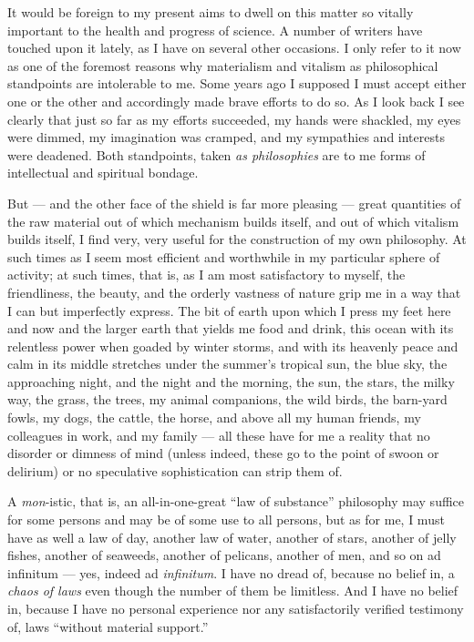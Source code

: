 \documentclass[a4paper, 11pt, oneside, polutonikogreek, english]{article}
\begin{document}
It would be foreign to my present aims to dwell on this matter so vitally important to the health and progress of science. A number of writers have touched upon it lately, as I have on several other occasions. I only refer to it now as one of the foremost reasons why materialism and vitalism as philosophical standpoints are intolerable to me. Some years ago I supposed I must accept either one or the other and accordingly made brave efforts to do so. As I look back I see clearly that just so far as my efforts succeeded, my hands were shackled, my eyes were dimmed, my imagination was cramped, and my sympathies and interests were deadened. Both standpoints, taken \emph{as philosophies} are to me forms of intellectual and spiritual bondage.

But --- and the other face of the shield is far more pleasing --- great quantities of the raw material out of which mechanism builds itself, and out of which vitalism builds itself, I find very, very useful for the construction of my own philosophy. At such times as I seem most efficient and worthwhile in my particular sphere of activity; at such times, that is, as I am most satisfactory to myself, the friendliness, the beauty, and the orderly vastness of nature grip me in a way that I can but imperfectly express. The bit of earth upon which I press my feet here and now and the larger earth that yields me food and drink, this ocean with its relentless power when goaded by winter storms, and with its heavenly peace and calm in its middle stretches under the summer's tropical sun, the blue sky, the approaching night, and the night and the morning, the sun, the stars, the milky way, the grass, the trees, my animal companions, the wild birds, the barn-yard fowls, my dogs, the cattle, the horse, and above all my human friends, my colleagues in work, and my family --- all these have for me a reality that no disorder or dimness of mind (unless indeed, these go to the point of swoon or delirium) or no speculative sophistication can strip them of.

A \emph{mon}-istic, that is, an all-in-one-great ``law of substance'' philosophy may suffice for some persons and may be of some use to all persons, but as for me, I must have as well a law of day, another law of water, another of stars, another of jelly fishes, another of seaweeds, another of pelicans, another of men, and so on ad infinitum --- yes, indeed ad \emph{infinitum}. I have no dread of, because no belief in, a \emph{chaos of laws} even though the number of them be limitless. And I have no belief in, because I have no personal experience nor any satisfactorily verified testimony of, laws ``without material support.''
\end{document}

